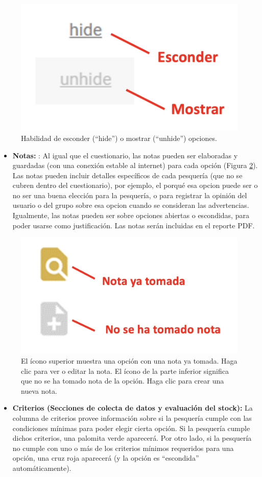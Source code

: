 \documentclass[
  11pt,
]{book}
\providecommand{\tightlist}{%
  \setlength{\itemsep}{0pt}\setlength{\parskip}{0pt}}
\begin{document}
\begin{figure}

{\centering \includegraphics[width=0.1\linewidth]{images/hide-es} 

}

\caption{Habilidad de esconder (“hide”) o mostrar (“unhide”) opciones.}\label{fig:hide}
\end{figure}

\begin{itemize}
\tightlist
\item
  \textbf{Notas:} : Al igual que el cuestionario, las notas pueden ser elaboradas y guardadas (con una conexión estable al internet) para cada opción (Figura \ref{fig:notes}). Las notas pueden incluir detalles específicos de cada pesquería (que no se cubren dentro del cuestionario), por ejemplo, el porqué esa opcion puede ser o no ser una buena elección para la pesquería, o para registrar la opinión del usuario o del grupo sobre esa opcion cuando se consideran las advertencias. Igualmente, las notas pueden ser sobre opciones abiertas o escondidas, para poder usarse como justificación. Las notas serán incluidas en el reporte PDF.
\end{itemize}

\begin{figure}

{\centering \includegraphics[width=0.15\linewidth]{images/notes-es} 

}

\caption{El ícono superior muestra una opción con una nota ya tomada. Haga clic para ver o editar la nota. El ícono de la parte inferior significa que no se ha tomado nota de la opción. Haga clic para crear una nueva nota.}\label{fig:notes}
\end{figure}

\begin{itemize}
\tightlist
\item
  \textbf{Criterios (Secciones de colecta de datos y evaluación del stock):} La columna de criterios provee información sobre si la pesquería cumple con las condiciones mínimas para poder elegir cierta opción. Si la pesquería cumple dichos criterios, una palomita verde aparecerá. Por otro lado, si la pesquería no cumple con uno o más de los criterios mínimos requeridos para una opción, una cruz roja aparecerá (y la opción es ``escondida'' automáticamente).
\end{itemize}
\end{document}
